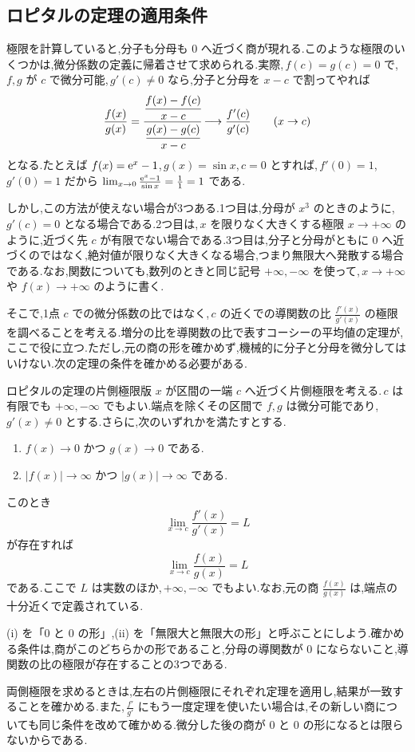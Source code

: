 \subsection{ロピタルの定理の適用条件}
極限を計算していると,分子も分母も $0$ へ近づく商が現れる.このような極限のいくつかは,微分係数の定義に帰着させて求められる.実際,\,$f(c)=g(c)=0$ で,\,$f,g$ が $c$ で微分可能,\,$g'(c)\ne0$ なら,分子と分母を $x-c$ で割ってやれば
\[
 \frac{f(x)}{g(x)}
 =\cfrac{\cfrac{f(x)-f(c)}{x-c}}{\cfrac{g(x)-g(c)}{x-c}}
 \longrightarrow\frac{f'(c)}{g'(c)}
 \qquad(x\to c)
\]
となる.たとえば $f(x)=\mathrm{e}^x-1$,\,$g(x)=\sin x$,\,$c=0$ とすれば,\,$f'(0)=1$,\,$g'(0)=1$ だから $\lim_{x\to0}\frac{\mathrm{e}^x-1}{\sin x}=\frac11=1$ である.

しかし,この方法が使えない場合が3つある.1つ目は,分母が $x^3$ のときのように,\,$g'(c)=0$ となる場合である.2つ目は,\,$x$ を限りなく大きくする極限 $x\to+\infty$ のように,近づく先 $c$ が有限でない場合である.3つ目は,分子と分母がともに $0$ へ近づくのではなく,絶対値が限りなく大きくなる場合,つまり無限大へ発散する場合である.なお,関数についても,数列のときと同じ記号 $+\infty,-\infty$ を使って,\,$x\to+\infty$ や $f(x)\to+\infty$ のように書く.

そこで,1点 $c$ での微分係数の比ではなく,\,$c$ の近くでの導関数の比 $\frac{f'(x)}{g'(x)}$ の極限を調べることを考える.増分の比を導関数の比で表すコーシーの平均値の定理が,ここで役に立つ.ただし,元の商の形を確かめず,機械的に分子と分母を微分してはいけない.次の定理の条件を確かめる必要がある.

\begin{theorem}{ロピタルの定理の片側極限版}\label{定理:ロピタル}
$x$ が区間の一端 $c$ へ近づく片側極限を考える.\,$c$ は有限でも $+\infty,-\infty$ でもよい.端点を除くその区間で $f,g$ は微分可能であり,\,$g'(x)\ne0$ とする.さらに,次のいずれかを満たすとする.
\begin{enumerate}[label=(\roman*),leftmargin=*]
 \item $f(x)\to0$ かつ $g(x)\to0$ である.
 \item $|f(x)|\to\infty$ かつ $|g(x)|\to\infty$ である.
\end{enumerate}
このとき
\[
 \lim_{x\to c}\frac{f'(x)}{g'(x)}=L
\]
が存在すれば
\[
 \lim_{x\to c}\frac{f(x)}{g(x)}=L
\]
である.ここで $L$ は実数のほか,\,$+\infty,-\infty$ でもよい.なお,元の商 $\frac{f(x)}{g(x)}$ は,端点の十分近くで定義されている.
\end{theorem}

(i) を「$0$ と $0$ の形」,(ii) を「無限大と無限大の形」と呼ぶことにしよう.確かめる条件は,商がこのどちらかの形であること,分母の導関数が $0$ にならないこと,導関数の比の極限が存在することの3つである.

両側極限を求めるときは,左右の片側極限にそれぞれ定理を適用し,結果が一致することを確かめる.また,\,$\frac{f'}{g'}$ にもう一度定理を使いたい場合は,その新しい商についても同じ条件を改めて確かめる.微分した後の商が $0$ と $0$ の形になるとは限らないからである.
